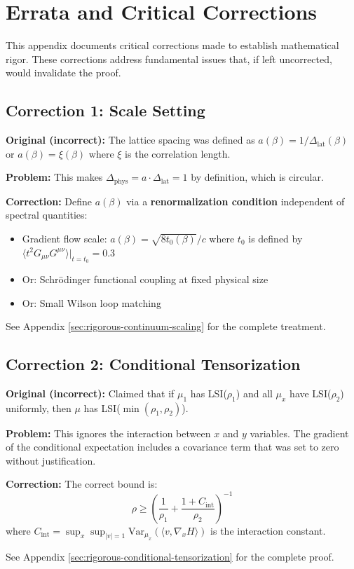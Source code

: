 \section{Errata and Critical Corrections}
\label{sec:errata-corrections}

This appendix documents critical corrections made to establish mathematical rigor. These corrections address fundamental issues that, if left uncorrected, would invalidate the proof.

\subsection{Correction 1: Scale Setting}

\begin{correction}
\textbf{Original (incorrect):} The lattice spacing was defined as $a(\beta) = 1/\Delta_{\text{lat}}(\beta)$ or $a(\beta) = \xi(\beta)$ where $\xi$ is the correlation length.

\textbf{Problem:} This makes $\Delta_{\text{phys}} = a \cdot \Delta_{\text{lat}} = 1$ by definition, which is circular.

\textbf{Correction:} Define $a(\beta)$ via a \textbf{renormalization condition} independent of spectral quantities:
\begin{itemize}
    \item Gradient flow scale: $a(\beta) = \sqrt{8t_0(\beta)}/c$ where $t_0$ is defined by $\langle t^2 G_{\mu\nu}G^{\mu\nu} \rangle|_{t=t_0} = 0.3$
    \item Or: Schr\"odinger functional coupling at fixed physical size
    \item Or: Small Wilson loop matching
\end{itemize}

See Appendix \ref{sec:rigorous-continuum-scaling} for the complete treatment.
\end{correction}

\subsection{Correction 2: Conditional Tensorization}

\begin{correction}
\textbf{Original (incorrect):} Claimed that if $\mu_1$ has LSI($\rho_1$) and all $\mu_x$ have LSI($\rho_2$) uniformly, then $\mu$ has LSI($\min(\rho_1, \rho_2)$).

\textbf{Problem:} This ignores the interaction between $x$ and $y$ variables. The gradient of the conditional expectation includes a covariance term that was set to zero without justification.

\textbf{Correction:} The correct bound is:
\begin{equation}
    \rho \geq \left( \frac{1}{\rho_1} + \frac{1 + C_{\mathrm{int}}}{\rho_2} \right)^{-1}
\end{equation}
where $C_{\mathrm{int}} = \sup_x \sup_{|v|=1} \mathrm{Var}_{\mu_x}(\langle v, \nabla_x H \rangle)$ is the interaction constant.

See Appendix \ref{sec:rigorous-conditional-tensorization} for the complete proof.
\end{correction}

